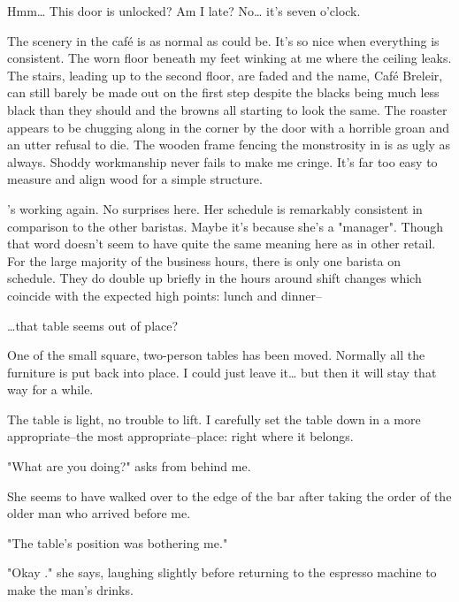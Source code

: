 {}


\noindent
Hmm\ldots{} This door is unlocked?  Am I late?  No\ldots{} it's seven o'clock.
\VV

\noindent
The scenery in the caf\'e is as normal as could be.
It's so nice when everything is consistent.
The worn floor beneath my feet winking at me where the ceiling leaks.
The stairs, leading up to the second floor, are faded and the name,
Caf\'e Breleir, can still barely be made out on the first step despite
the blacks being much less black than they should and the browns all
starting to look the same.  The roaster appears to be chugging along
in the corner by the door with a horrible groan and an utter refusal to die.
The wooden frame fencing the monstrosity in is as ugly as always.
Shoddy workmanship never fails to make me cringe.
It's far too easy to measure and align wood for a simple structure.


\april{}'s working again.  No surprises here.
Her schedule is remarkably consistent in comparison to the other baristas.
Maybe it's because she's a "manager".  Though that word doesn't seem to
have quite the same meaning here as in other retail.
For the large majority of the business hours, there is only one barista
on schedule.  They do double up briefly in the hours around shift changes
which coincide with the expected high points: lunch and dinner--


\ldots{}that table seems out of place?


One of the small square, two-person tables has been moved.
Normally all the furniture is put back into place.
I could just leave it\ldots{} but then it will stay that way for a while.


The table is light, no trouble to lift.
I carefully set the table down in a more
appropriate--the most appropriate--place:
right where it belongs.
\VV


"What are you doing?" \april{} asks from behind me.
\VV


\noindent
She seems to have walked over to the edge of the bar after taking the order
of the older man who arrived before me.
\VV


"The table's position was bothering me."
\VV


"Okay \josh." she says, laughing slightly before returning to
the espresso machine to make the man's drinks.
\VV


